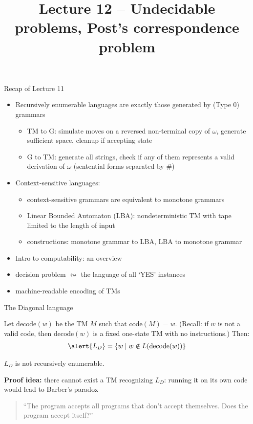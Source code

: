 \documentclass[handout]{beamer}
\title{Lecture 12 -- Undecidable problems, Post's correspondence problem}
\begin{document}
\frame{\titlepage}


\begin{frame}{Recap of Lecture 11}
	
    \begin{itemize}        
        \item Recursively enumerable languages are exactly those generated by (Type 0) grammars
        \begin{itemize}
            \item TM to G: simulate moves on a reversed non-terminal copy of $\omega$, generate sufficient space, cleanup if accepting state
            \item G to TM: generate all strings, check if any of them represents a valid derivation of $\omega$ (sentential forms separated by $\#$)
        \end{itemize}   
        \item Context-sensitive languages:
        \begin{itemize}
            \item context-sensitive grammars are equivalent to monotone grammars
            \item Linear Bounded Automaton (LBA): nondeterministic TM with tape limited to the length of input
            \item constructions: monotone grammar to LBA, LBA to monotone grammar
        \end{itemize}
        \item Intro to computability: an overview
        \item decision problem $\leftrightsquigarrow$ the language of all `YES' instances
        \item machine-readable encoding of TMs
    \end{itemize}
	
\end{frame}



\begin{frame}{The Diagonal language}
    
    Let \alert{$\mathrm{decode}(w)$} be the TM $M$ such that $\mathrm{code}(M)=w$. (Recall: if $w$ is not a valid code, then $\mathrm{decode}(w)$ is a fixed one-state TM with no instructions.) Then:
    $$
    \alert{L_D}=\{w\mid w\notin L(\mathrm{decode}(w))\}
    $$
        
    \begin{theorem}
        $L_D$ is not recursively enumerable.
    \end{theorem}
    
    \textbf{Proof idea:} there cannot exist a TM recognizing $L_D$: running it on its own code would lead to Barber's paradox

    \bigskip

    \begin{quote}
        ``The program accepts all programs that don't accept themselves. Does the program accept itself?''
    \end{quote}

\end{frame}
\end{document}
